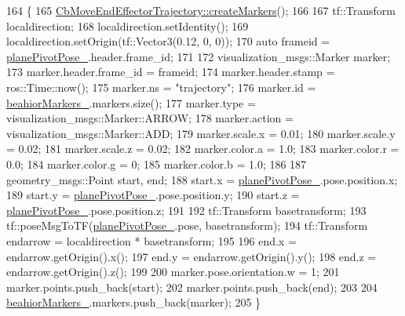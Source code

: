 \begin{DoxyCode}
164     \{
165         \hyperlink{classcl__move__group__interface_1_1CbMoveEndEffectorTrajectory_a442efa1d5bc9e9a16f74ecd31b13d9b5}{CbMoveEndEffectorTrajectory::createMarkers}();
166 
167         tf::Transform localdirection;
168         localdirection.setIdentity();
169         localdirection.setOrigin(tf::Vector3(0.12, 0, 0));
170         \textcolor{keyword}{auto} frameid = \hyperlink{classcl__move__group__interface_1_1CbCircularPivotMotion_a0994efbe93b9f9a61fcf3703c360cda2}{planePivotPose\_}.header.frame\_id;
171 
172         visualization\_msgs::Marker marker;
173         marker.header.frame\_id = frameid;
174         marker.header.stamp = ros::Time::now();
175         marker.ns = \textcolor{stringliteral}{"trajectory"};
176         marker.id = \hyperlink{classcl__move__group__interface_1_1CbMoveEndEffectorTrajectory_a809fb5385adf27c0a1c8f8136566949c}{beahiorMarkers\_}.markers.size();
177         marker.type = visualization\_msgs::Marker::ARROW;
178         marker.action = visualization\_msgs::Marker::ADD;
179         marker.scale.x = 0.01;
180         marker.scale.y = 0.02;
181         marker.scale.z = 0.02;
182         marker.color.a = 1.0;
183         marker.color.r = 0.0;
184         marker.color.g = 0;
185         marker.color.b = 1.0;
186 
187         geometry\_msgs::Point start, end;
188         start.x = \hyperlink{classcl__move__group__interface_1_1CbCircularPivotMotion_a0994efbe93b9f9a61fcf3703c360cda2}{planePivotPose\_}.pose.position.x;
189         start.y = \hyperlink{classcl__move__group__interface_1_1CbCircularPivotMotion_a0994efbe93b9f9a61fcf3703c360cda2}{planePivotPose\_}.pose.position.y;
190         start.z = \hyperlink{classcl__move__group__interface_1_1CbCircularPivotMotion_a0994efbe93b9f9a61fcf3703c360cda2}{planePivotPose\_}.pose.position.z;
191 
192         tf::Transform basetransform;
193         tf::poseMsgToTF(\hyperlink{classcl__move__group__interface_1_1CbCircularPivotMotion_a0994efbe93b9f9a61fcf3703c360cda2}{planePivotPose\_}.pose, basetransform);
194         tf::Transform endarrow = localdirection * basetransform;
195 
196         end.x = endarrow.getOrigin().x();
197         end.y = endarrow.getOrigin().y();
198         end.z = endarrow.getOrigin().z();
199 
200         marker.pose.orientation.w = 1;
201         marker.points.push\_back(start);
202         marker.points.push\_back(end);
203 
204         \hyperlink{classcl__move__group__interface_1_1CbMoveEndEffectorTrajectory_a809fb5385adf27c0a1c8f8136566949c}{beahiorMarkers\_}.markers.push\_back(marker);
205     \}
\end{DoxyCode}
